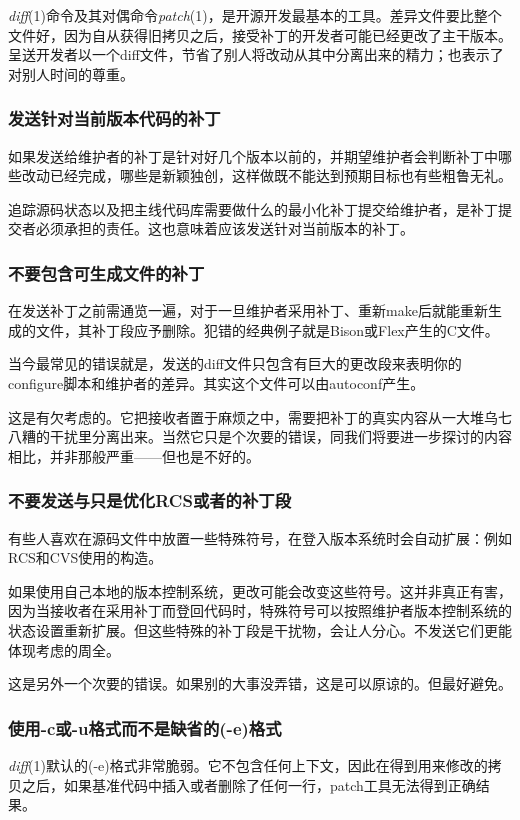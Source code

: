 \documentclass[12pt,oneside]{ctexbook}
\begin{document}
\begin{common-format}
\textit{diff}(1)命令及其对偶命令\textit{patch}(1)，是开源开发最基本的工具。差异文件要比整个文件好，因为自从获得旧拷贝之后，接受补丁的开发者可能已经更改了主干版本。呈送开发者以一个diff文件，节省了别人将改动从其中分离出来的精力；也表示了对别人时间的尊重。

\subsubsection{发送针对当前版本代码的补丁}
如果发送给维护者的补丁是针对好几个版本以前的，并期望维护者会判断补丁中哪些改动已经完成，哪些是新颖独创，这样做既不能达到预期目标也有些粗鲁无礼。

追踪源码状态以及把主线代码库需要做什么的最小化补丁提交给维护者，是补丁提交者必须承担的责任。这也意味着应该发送针对当前版本的补丁。

\subsubsection{不要包含可生成文件的补丁}
在发送补丁之前需通览一遍，对于一旦维护者采用补丁、重新make后就能重新生成的文件，其补丁段应予删除。犯错的经典例子就是Bison或Flex产生的C文件。

当今最常见的错误就是，发送的diff文件只包含有巨大的更改段来表明你的configure脚本和维护者的差异。其实这个文件可以由autoconf产生。

这是有欠考虑的。它把接收者置于麻烦之中，需要把补丁的真实内容从一大堆乌七八糟的干扰里分离出来。当然它只是个次要的错误，同我们将要进一步探讨的内容相比，并非那般严重——但也是不好的。

\subsubsection{不要发送与只是优化RCS或者的补丁段}
有些人喜欢在源码文件中放置一些特殊符号，在登入版本系统时会自动扩展：例如RCS和CVS使用的构造。

如果使用自己本地的版本控制系统，更改可能会改变这些符号。这并非真正有害，因为当接收者在采用补丁而登回代码时，特殊符号可以按照维护者版本控制系统的状态设置重新扩展。但这些特殊的补丁段是干扰物，会让人分心。不发送它们更能体现考虑的周全。

这是另外一个次要的错误。如果别的大事没弄错，这是可以原谅的。但最好避免。

\subsubsection{使用-c或-u格式而不是缺省的(-e)格式}
\textit{diff}(1)默认的(-e)格式非常脆弱。它不包含任何上下文，因此在得到用来修改的拷贝之后，如果基准代码中插入或者删除了任何一行，patch工具无法得到正确结果。


\end{common-format}
\end{document}
